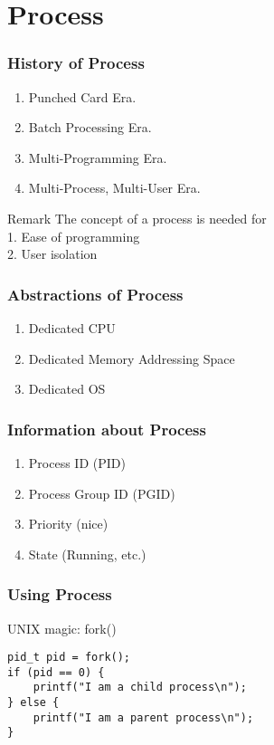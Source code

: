 \section[Process]{Process}

\begin{frame}
    \frametitle{History of Process}
    \begin{enumerate}
        \item Punched Card Era.
        \item Batch Processing Era.
        \item Multi-Programming Era.
        \item Multi-Process, Multi-User Era.
    \end{enumerate}

    \vspace{2em}

    \begin{alertblock}{Remark}
        The concept of a process is needed for \\
        1. Ease of programming \\
        2. User isolation
    \end{alertblock}
\end{frame}

\begin{frame}
    \frametitle{Abstractions of Process}
    \begin{enumerate}
        \item Dedicated CPU
        \item Dedicated Memory Addressing Space
        \item Dedicated OS
    \end{enumerate}
\end{frame}

\begin{frame}
    \frametitle{Information about Process}
    \begin{enumerate}
        \item Process ID (PID)
        \item Process Group ID (PGID)
        \item Priority (nice)
        \item State (Running, etc.)
    \end{enumerate}
\end{frame}

\begin{frame}[fragile]
    \frametitle{Using Process}
    UNIX magic: fork()
    \begin{lstlisting}
pid_t pid = fork();
if (pid == 0) {
    printf("I am a child process\n");
} else {
    printf("I am a parent process\n");
}
    \end{lstlisting}
\end{frame}
